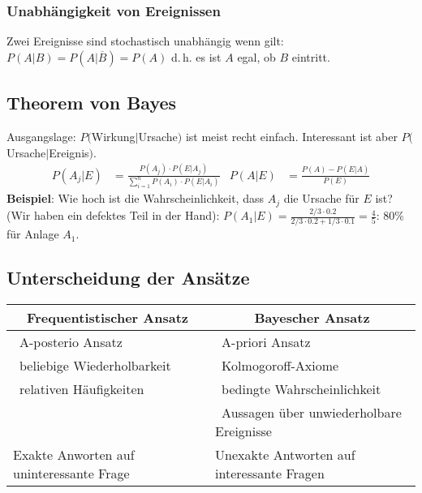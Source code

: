 \subsubsection{Unabhängigkeit von Ereignissen}
Zwei Ereignisse sind stochastisch unabhängig wenn gilt: $P(A|B) = P(A|\overline{B}) = P(A)$
d.\,h. es ist $A$ egal, ob $B$ eintritt.

\subsection{Theorem von Bayes}
Ausgangslage: $P($Wirkung$|$Ursache$)$ ist meist recht einfach. Interessant ist aber $P($Ursache$|$Ereignis$)$.
\begin{align*}
	P(A_j|E)& = \frac{P(A_j) \cdot P(E | A_j)}{\sum_{i=1}^n P(A_i) \cdot P(E|A_i)} & P(A|E)& = \frac{P(A) - P(E|A)}{P(E)}
\end{align*}
\textbf{Beispiel}: Wie hoch ist die Wahrscheinlichkeit, dass $A_j$ die Ursache für $E$ ist? (Wir haben ein defektes Teil in der Hand):
$P(A_1|E) = \frac{2/3 \cdot 0.2}{2/3 \cdot 0.2 + 1/3 \cdot 0.1} = \frac{4}{5}$: 80\% für Anlage $A_1$.

\subsection{Unterscheidung der Ansätze}
\begin{tabular}{@{}p{}%
				@{}|p{}}
	\multicolumn{1}{c}{\textbf{Frequentistischer Ansatz}} & \multicolumn{1}{|c}{\textbf{Bayescher Ansatz}}\\\hline
	\textbullet~A-posterio Ansatz	& \textbullet~A-priori Ansatz\\
	\textbullet~beliebige Wiederholbarkeit & \textbullet~Kolmogoroff-Axiome\\
	\textbullet~relativen Häufigkeiten & \textbullet~bedingte Wahrscheinlichkeit\\
										&\textbullet~Aussagen über unwiederholbare Ereignisse\\
	Exakte Anworten auf uninteressante Frage & Unexakte Antworten auf interessante Fragen
\end{tabular}


